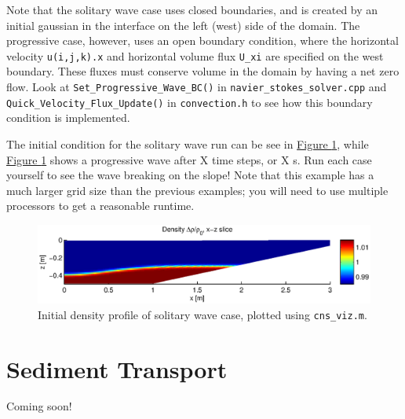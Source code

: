 \documentclass[12pt]{report}
\begin{document}
Note that the solitary wave case uses closed boundaries, and is created by an initial gaussian in the interface on the left (west) side of the domain. The progressive case, however, uses an open boundary condition, where the horizontal velocity \texttt{u(i,j,k).x} and horizontal volume flux \texttt{U\_xi} are specified on the west boundary. These fluxes must conserve volume in the domain by having a net zero flow. Look at \texttt{Set\_Progressive\_Wave\_BC()} in \texttt{navier\_stokes\_solver.cpp} and \texttt{Quick\_Velocity\_Flux\_Update()} in \texttt{convection.h} to see how this boundary condition is implemented.

The initial condition for the solitary wave run can be see in \hyperref[fig:solitary]{Figure \ref*{fig:solitary}}, while \hyperref[fig:solitary]{Figure \ref*{fig:solitary}} shows a progressive wave after X time steps, or X s. Run each case yourself to see the wave breaking on the slope! Note that this example has a much larger grid size than the previous examples; you will need to use multiple processors to get a reasonable runtime.
\begin{figure}
\centering
\includegraphics[scale=0.9]{solitary}
\caption{Initial density profile of solitary wave case, plotted using \texttt{cns\_viz.m}.}
\label{fig:solitary}
\end{figure}

\section{Sediment Transport}
Coming soon!



\end{document}
